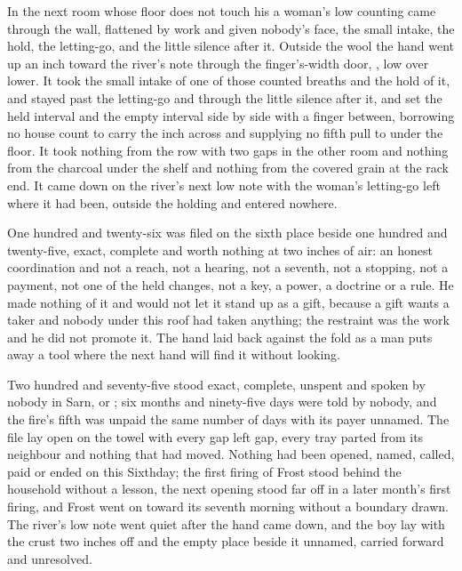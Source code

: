 In the next room whose floor does not touch his a woman's low counting came through the wall, flattened by work and given nobody's face, the small intake, the hold, the letting-go, and the little silence after it. Outside the wool the hand went up an inch toward the river's note through the finger's-width door, , low over lower. It took the small intake of one of those counted breaths and the hold of it, and stayed past the letting-go and through the little silence after it, and set the held interval and the empty interval side by side with a finger between, borrowing no house count to carry the inch across and supplying no fifth pull to  under the floor. It took nothing from the row with two gaps in the other room and nothing from the charcoal under the shelf and nothing from the covered grain at the rack end. It came down on the river's next low note with the woman's letting-go left where it had been, outside the holding and entered nowhere.

One hundred and twenty-six was filed on the sixth place beside one hundred and twenty-five, exact, complete and worth nothing at two inches of air: an honest coordination and not a reach, not a hearing, not a seventh, not a stopping, not a payment, not one of the held changes, not a key, a power, a doctrine or a rule. He made nothing of it and would not let it stand up as a gift, because a gift wants a taker and nobody under this roof had taken anything; the restraint was the work and he did not promote it. The hand laid back against the fold as a man puts away a tool where the next hand will find it without looking.

Two hundred and seventy-five stood exact, complete, unspent and spoken by nobody in Sarn,  or ; six months and ninety-five days were told by nobody, and the fire's fifth was unpaid the same number of days with its payer unnamed. The file lay open on the towel with every gap left gap, every tray parted from its neighbour and nothing that had moved. Nothing had been opened, named, called, paid or ended on this Sixthday; the first firing of Frost stood behind the household without a lesson, the next opening stood far off in a later month's first firing, and Frost went on toward its seventh morning without a boundary drawn. The river's low note went quiet after the hand came down, and the boy lay with the crust two inches off and the empty place beside it unnamed, carried forward and unresolved.
